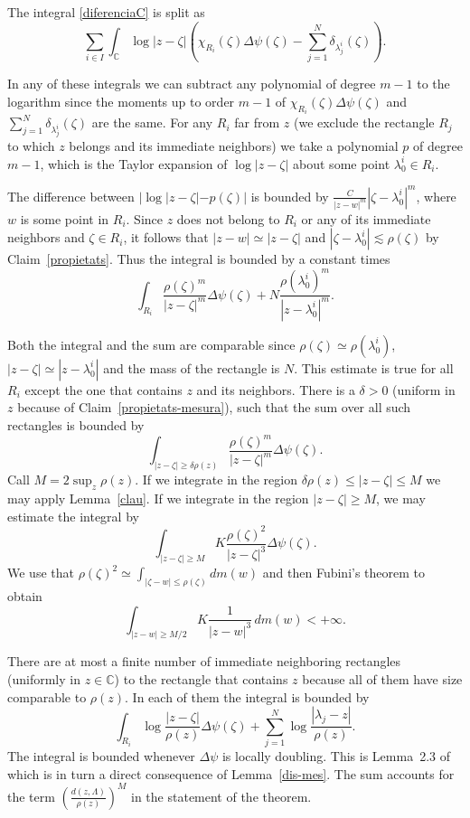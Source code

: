 \documentclass[12pt,twoside,final,psamsfonts]{amsart}
\theoremstyle{plain}
\theoremstyle{remark}
\theoremstyle{definition}
\newcommand{\C}{{\mathbb C}}
\begin{document}
The integral \eqref{diferenciaC} is split as
\[
\sum_{i\in I}\int_{\C} \log |z-\zeta| 
\left(\chi_{R_i}(\zeta)\Delta\psi(\zeta)-\sum_{j=1}^N
\delta_{\lambda_j^i}(\zeta)\right).
\]

In any of these integrals we can subtract any polynomial of degree $m-1$ to the
logarithm since the moments up to order $m-1$ of 
$\chi_{R_i}(\zeta)\Delta\psi(\zeta)$ and $\sum_{j=1}^N  \delta_{\lambda_j^i}
(\zeta)$
are the same. For any $R_i$ far from $z$ (we exclude the rectangle  $R_j$ to
which $z$ belongs and its immediate neighbors) we take a polynomial 
$p$  of degree
$m-1$, which is the Taylor expansion of $\log|z-\zeta|$ about some point 
$\lambda_0^i\in R_i$.

The difference between $|\log|z-\zeta|-p(\zeta)|$ is bounded by $\frac
C{|z-w|^{m}}|\zeta-\lambda_0^i|^m$, where $w$ is some point in $R_i$. Since $z$
does not belong to $R_i$ or any of its immediate neighbors and $\zeta\in R_i$, 
it follows that $|z-w|\simeq |z-\zeta|$ and  $|\zeta-\lambda_0^i|\lesssim
\rho(\zeta)$ by Claim~\ref{propietats}. Thus the integral is bounded by a constant times
\[
\int_{R_i}\frac{\rho(\zeta)^{m}}{|z-\zeta|^{m}}\Delta\psi(\zeta)+
N\frac{\rho(\lambda_0^i)^{m}}{|z-\lambda_0^i|^{m}}.
\]

Both the integral and the sum are comparable since $\rho(\zeta)\simeq 
\rho(\lambda_0^i)$, $|z-\zeta|\simeq |z-\lambda_0^i|$ and the mass of the rectangle is $N$.
This estimate is true for all $R_i$ except the one that contains $z$
and its neighbors. There is a $\delta>0$ (uniform in $z$ because of
Claim~\ref{propietats-mesura}), such that the sum over 
all such rectangles is bounded by
\[
\int_{|z-\zeta|\ge \delta\rho(z)} 
\frac{\rho(\zeta)^m}{|z-\zeta|^{m}}\Delta\psi(\zeta).
\] 
Call $M=2\sup_z \rho(z)$. 
If we integrate in the region $\delta\rho(z)\le|z-\zeta|\le M$ we may apply
Lemma~\ref{clau}. If we integrate in the region $|z-\zeta|\ge M$, we may
estimate the integral by
\[
\int_{|z-\zeta|\ge M} 
K\frac{\rho(\zeta)^2}{|z-\zeta|^{3}}\Delta\psi(\zeta).
\]
We use that $\rho(\zeta)^2\simeq \int_{|\zeta-w|\le\rho(\zeta)}dm(w)$ 
and then
Fubini's theorem to obtain
\[
\int_{|z-w|\ge M/2} 
K\frac{1}{|z-w|^{3}}\, dm(w)<+\infty.
\]

There are at most a finite number of immediate neighboring rectangles (uniformly
in $z\in \C$) to the rectangle that contains $z$ because all of them have size
comparable to $\rho(z)$. In each of them the integral is bounded by
\[
\int_{R_i} \log \frac{|z-\zeta|}{\rho(z)}\Delta\psi(\zeta) +
\sum_{j=1}^N\log\frac{|\lambda_j-z|}{\rho(z)}.
\]
The integral is bounded whenever $\Delta\psi$ is locally doubling. This is
Lemma~2.3 of \cite{Christ91} which is in turn a  direct consequence of 
Lemma~\ref{dis-mes}. The sum accounts for the term
$\left(\frac{d(z,\Lambda)}{\rho(z)}\right)^M$ in the statement of the theorem.
\end{document}
